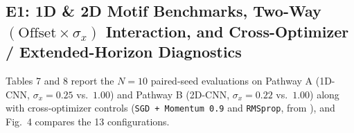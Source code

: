 \documentclass[11pt, a4paper]{article}
\begin{document}
\begin{enumerate}
\begin{table}[htbp]
\centering
\caption{Direct causal intervention on fourth-layer pre-activation variance $q_4 = \mathrm{Var}(x_4)$ for Smooth RectLU ($L=0, W=2$) on Pathway B 2D Spatial Motifs ($\sigma_x = 0.22$, $N=10$ paired seeds, 20 epochs, \texttt{v9\_reviewer\_3\_4\_causal\_q4\_intervention\_10seeds.csv}).}
\label{tab:causal_q4_intervention}
\end{table}

\end{enumerate}

\subsection{E1: 1D \& 2D Motif Benchmarks, Two-Way $(\text{Offset} \times \sigma_{x})$ Interaction, and Cross-Optimizer / Extended-Horizon Diagnostics}
Tables 7 and 8 report the $N = 10$ paired-seed evaluations on Pathway A (1D-CNN, $\sigma_{x}=0.25$ vs.\ $1.00$) and Pathway B (2D-CNN, $\sigma_{x}=0.22$ vs.\ $1.00$) along with cross-optimizer controls (\texttt{SGD + Momentum 0.9} and \texttt{RMSprop}, from ), and Fig.\ 4 compares the 13 configurations.
\end{document}
